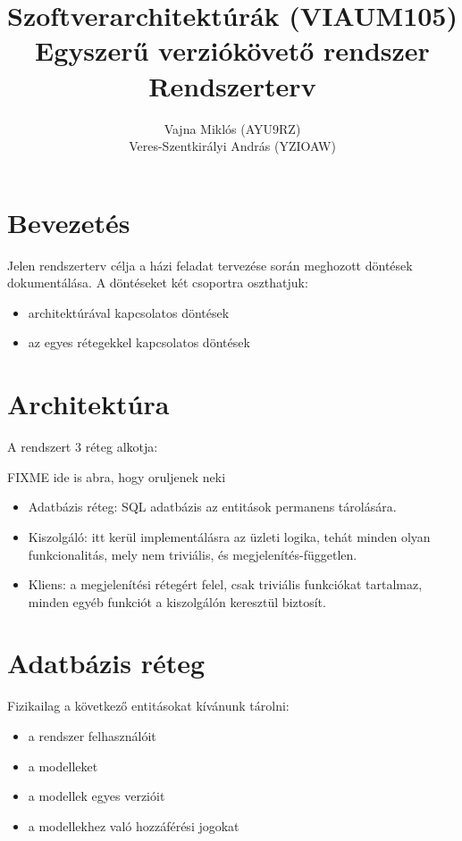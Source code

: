 \documentclass[a4paper,12pt]{article}
\title{Szoftverarchitektúrák (VIAUM105)\\Egyszerű verziókövető rendszer\\Rendszerterv}
\author{Vajna Miklós (AYU9RZ)\\Veres-Szentkirályi András (YZIOAW)}
\begin{document}
\maketitle
\thispagestyle{empty}
\lstset{numbers=left, numberstyle=\tiny, basicstyle=\ttfamily, breaklines=true, frame=single, tabsize=2}

\pagebreak
\onehalfspacing
\section{Bevezetés}

Jelen rendszerterv célja a házi feladat tervezése során meghozott döntések
dokumentálása. A döntéseket két csoportra oszthatjuk:

\begin{itemize}
\item architektúrával kapcsolatos döntések
\item az egyes rétegekkel kapcsolatos döntések
\end{itemize}

\section{Architektúra}

A rendszert 3 réteg alkotja:

FIXME ide is abra, hogy oruljenek neki

\begin{itemize}
\item Adatbázis réteg: SQL adatbázis az entitások permanens tárolására.
\item Kiszolgáló: itt kerül implementálásra az üzleti logika, tehát minden
olyan funkcionalitás, mely nem triviális, és megjelenítés-független.
\item Kliens: a megjelenítési rétegért felel, csak triviális funkciókat
tartalmaz, minden egyéb funkciót a kiszolgálón keresztül biztosít.
\end{itemize}

\section{Adatbázis réteg}

Fizikailag a következő entitásokat kívánunk tárolni:

\begin{itemize}
\item a rendszer felhasználóit
\item a modelleket
\item a modellek egyes verzióit
\item a modellekhez való hozzáférési jogokat
\end{itemize}
\end{document}
